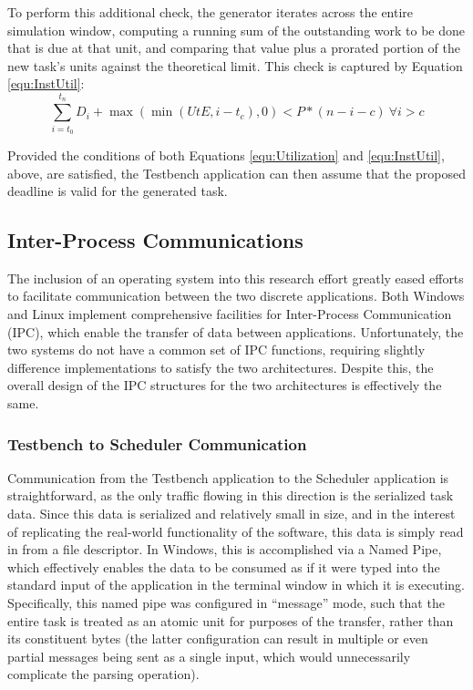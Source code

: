 To perform this additional check, the generator iterates across the entire simulation window, computing a running sum of the outstanding work to be done that is due at that unit, and comparing that value plus a prorated portion of the new task's units against the theoretical limit. This check is captured by Equation \ref{equ:InstUtil}:
\begin{equation}\label{equ:InstUtil}
    \sum_{i=t_0}^{t_n}D_i + \max(\min(UtE, i - t_c), 0) < P*(n-i-c)\:\forall i>c
\end{equation}

Provided the conditions of both Equations \ref{equ:Utilization} and \ref{equ:InstUtil}, above, are satisfied, the Testbench application can then assume that the proposed deadline is valid for the generated task.

\subsection{Inter-Process Communications}\label{subsec:IPC}
The inclusion of an operating system into this research effort greatly eased efforts to facilitate communication between the two discrete applications. Both Windows and Linux implement comprehensive facilities for Inter-Process Communication (IPC), which enable the transfer of data between applications. Unfortunately, the two systems do not have a common set of IPC functions, requiring slightly difference implementations to satisfy the two architectures. Despite this, the overall design of the IPC structures for the two architectures is effectively the same.

\subsubsection{Testbench to Scheduler Communication}\label{subsubsec:TestbenchSchedIPC}
Communication from the Testbench application to the Scheduler application is straightforward, as the only traffic flowing in this direction is the serialized task data. Since this data is serialized and relatively small in size, and in the interest of replicating the real-world functionality of the software, this data is simply read in from a file descriptor. In Windows, this is accomplished via a Named Pipe, which effectively enables the data to be consumed as if it were typed into the standard input of the application in the terminal window in which it is executing. Specifically, this named pipe was configured in ``message'' mode, such that the entire task is treated as an atomic unit for purposes of the transfer, rather than its constituent bytes (the latter configuration can result in multiple or even partial messages being sent as a single input, which would unnecessarily complicate the parsing operation).

